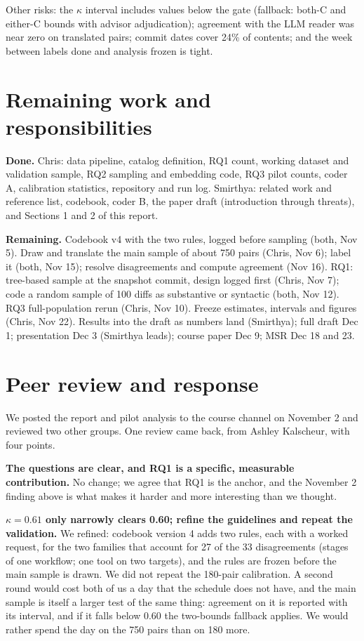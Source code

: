 \documentclass[10pt]{article}
\begin{document}
Other risks: the $\kappa$ interval includes values below the gate (fallback: both-C and either-C bounds with advisor
adjudication); agreement with the LLM reader was near zero on translated pairs; commit dates cover 24\% of contents;
and the week between labels done and analysis frozen is tight.

\section{Remaining work and responsibilities}
\textbf{Done.} Chris: data pipeline, catalog definition, RQ1 count, working dataset and validation sample, RQ2
sampling and embedding code, RQ3 pilot counts, coder A, calibration statistics, repository and run log. Smirthya:
related work and reference list, codebook, coder B, the paper draft (introduction through threats), and Sections 1 and
2 of this report.

\textbf{Remaining.} Codebook v4 with the two rules, logged before sampling (both, Nov 5). Draw and translate the main
sample of about 750 pairs (Chris, Nov 6); label it (both, Nov 15); resolve disagreements and compute agreement (Nov 16).
RQ1: tree-based sample at the snapshot commit, design logged first (Chris, Nov 7); code a random sample of 100 diffs
as substantive or syntactic (both, Nov 12). RQ3 full-population rerun (Chris, Nov 10). Freeze estimates, intervals and figures (Chris, Nov 22).
Results into the draft as numbers land (Smirthya); full draft Dec 1; presentation Dec 3 (Smirthya leads); course paper Dec 9; MSR Dec 18 and 23.

\section{Peer review and response}
We posted the report and pilot analysis to the course channel on November 2 and reviewed two other groups. One review
came back, from Ashley Kalscheur, with four points.

\textbf{The questions are clear, and RQ1 is a specific, measurable contribution.} No change; we agree that RQ1 is the
anchor, and the November 2 finding above is what makes it harder and more interesting than we thought.

\textbf{$\kappa = 0.61$ only narrowly clears 0.60; refine the guidelines and repeat the validation.} We refined: codebook
version 4 adds two rules, each with a worked request, for the two families that account for 27 of the 33
disagreements (stages of one workflow; one tool on two targets), and the rules are frozen before the main sample is
drawn. We did not repeat the 180-pair calibration. A second round would cost both of us a day that the schedule does not
have, and the main sample is itself a larger test of the same thing: agreement on it is reported with its interval, and
if it falls below 0.60 the two-bounds fallback applies. We would rather spend the day on the 750 pairs than on 180 more.
\end{document}
